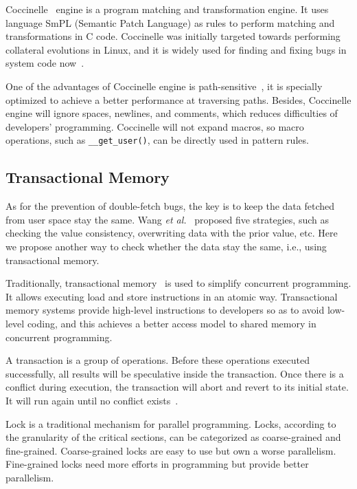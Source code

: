 \documentclass[10pt]{llncs}
\begin{document}
Coccinelle~\cite{Jones2007The,Stuart2008Hunting} engine is a program matching and transformation engine. It uses language SmPL (Semantic Patch Language) as rules to perform matching and transformations in C code. Coccinelle was initially targeted towards performing collateral evolutions in Linux, and it is widely used for finding and fixing bugs in system code now~\cite{lawall2010finding}.

One of the advantages of Coccinelle engine is path-sensitive~\cite{Jones2007The}, it is specially optimized to achieve a better performance at traversing paths. Besides, Coccinelle engine will ignore spaces, newlines, and comments, which reduces difficulties of developers' programming. Coccinelle will not expand macros, so macro operations, such as \verb:__get_user():, can be directly used in pattern rules.

\subsection{Transactional Memory}
\label{back3}
As for the prevention of double-fetch bugs, the key is to keep the data fetched from user space stay the same. Wang \textit{et al.}~\cite{wang} proposed five strategies, such as checking the value consistency, overwriting data with the prior value, etc. Here we propose another way to check whether the data stay the same, i.e., using transactional memory.

Traditionally, transactional memory~\cite{Herlihy1993Transactional,Harris2010Transactional,Hammond2004Transactional} is used to simplify concurrent programming. It allows executing load and store instructions in an atomic way. Transactional memory systems provide high-level instructions to developers so as to avoid low-level coding, and this achieves a better access model to shared memory in concurrent programming.

A transaction is a group of operations. Before these operations executed successfully, all results will be speculative inside the transaction. Once there is a conflict during execution, the transaction will abort and revert to its initial state. It will run again until no conflict exists~\cite{Harris2010Transactional}. 

Lock is a traditional mechanism for parallel programming. Locks, according to the granularity of the critical sections, can be categorized as coarse-grained and fine-grained. Coarse-grained locks are easy to use but own a worse parallelism. Fine-grained locks need more efforts in programming but provide better parallelism.
\end{document}
